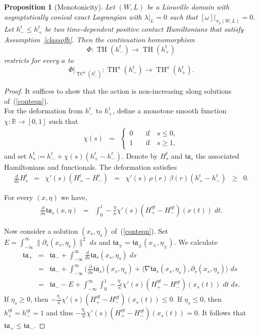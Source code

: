 \documentclass{amsart}
\newcommand{\tacal}{{\mathfrak{ta}}}
\newcommand{\RR}{\mathbb{R}}
\renewcommand{\TH}{\operatorname{TH}}
\newcommand{\TC}{\operatorname{TC}}
\newtheorem{proposition}{Proposition}[section]
\theoremstyle{definition}
\theoremstyle{remark}
\numberwithin{equation}{section}
\begin{document}
\begin{proposition}[Monotonicity]\label{monotonicity}
	Let $(W,L)$ be a Liouville domain with asymptotically conical exact Lagrangian with $\lambda|_L=0$ such that $[\omega]|_{\pi_2(W,L)}=0$. Let $h_-^t\leq h_+^t$ be two time-dependent positive contact Hamiltonians that satisfy Assumption~\ref{classofh}. Then the continuation homomorphism 
	$$\Phi:\TH(h_-^t)\to \TH(h_+^t)$$
	restricts for every $a$ to 
	$$\Phi|_{\TC^a(h_-^t)}:\TH^a(h_-^t)\to \TH^a(h_+^t).$$
\end{proposition}
\begin{proof}
	It suffices to show that the action is non-increasing along solutions of~(\ref{conteqn}).\\

For the deformation from $h_-^t$ to $h_+^t$, define a monotone smooth function $\chi:\RR\to[0,1]$ such that
\begin{eqnarray*}
	\chi(s)&=&\begin{cases}0&\quad\mbox{if}\quad s\leq0,\\
	1&\quad\mbox{if}\quad s\geq 1,\end{cases}
\end{eqnarray*}
and set $h_s^t:=h^t_- + \chi(s)(h_+^t-h_-^t)$. Denote by $H_s^t$ and $\tacal_s$ the associated Hamiltonians and functionals. The deformation satisfies 
$$\begin{array}{ccccccc}
\frac{d}{ds}H_s^t &=& \chi'(s)(H_+^t-H_-^t) &=& \chi'(s)\,\rho(r)\,\beta(r)(h^t_+-h_-^t) &\geq& 0.
\end{array}$$

 For every $(x,\eta)$ we have,
\begin{eqnarray*}
	\frac{\partial}{\partial s} \tacal_s(x,\eta)&=&\int_0^1-\frac\eta\kappa\chi'(s)(H_+^{\eta t}-H_-^{\eta t})(x(t)) \;dt.\nonumber
\end{eqnarray*}

 Now consider a solution $(x_s,\eta_s)$ of~(\ref{conteqn}). Set $E=\int_{-\infty}^\infty \|\partial_s (x_s,\eta_s)\|^2\;ds$ and $\tacal_\pm=\tacal_\pm(x_\pm,\eta_\pm)$. 
We calculate
\begin{eqnarray}
	\tacal_+&=&\tacal_-+\int_{-\infty}^\infty\frac d{ds}\tacal_s(x_s,\eta_s)\;ds\nonumber\\
	&=&\tacal_-+\int_{-\infty}^\infty\Big(\frac\partial{\partial s}\tacal_s\Big)(x_s,\eta_s)+\big\langle\nabla\tacal_s(x_s,\eta_s),\partial_s(x_s,\eta_s)\big\rangle \;ds\nonumber\\
	&=&\tacal_--E+\int_{-\infty}^\infty\int_0^1-\frac{\eta_s}\kappa\chi'(s)(H_+^{\eta t}-H_-^{\eta t})(x_s(t)) \;dt\;ds.\nonumber
\end{eqnarray}
 If $\eta_s\geq0$, then $-\frac{\eta_s}\kappa\chi'(s)(H_+^{\eta t}-H_-^{\eta t})(x_s(t))\leq0$. If $\eta_s\leq0$, then $h_+^{\eta t}=h_-^{\eta t}=1$ and thus $-\frac{\eta_s}\kappa\chi'(s)(H_+^{\eta t}-H_-^{\eta t})(x_s(t))=0$. It follows that $\tacal_+\leq\tacal_-$. 
\end{proof}
\end{document}
